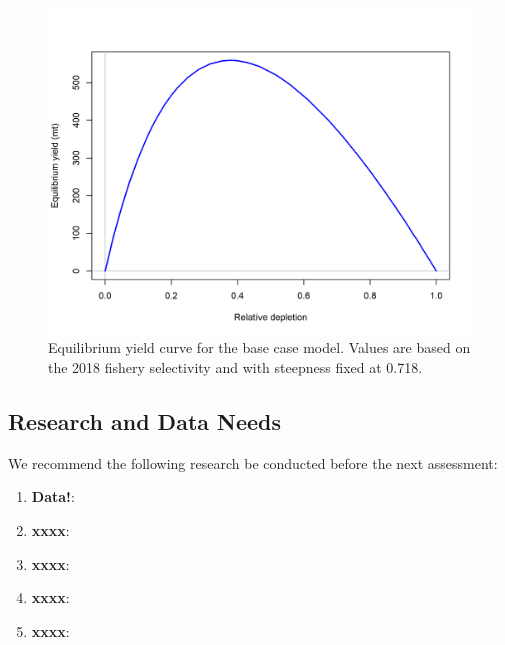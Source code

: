 \documentclass[12pt,]{article}
\begin{document}
\begin{figure}
\centering
\includegraphics{r4ss/plots_mod1/yield1_yield_curve.png}
\caption{Equilibrium yield curve for the base case model. Values are
based on the 2018 fishery selectivity and with steepness fixed at 0.718.
\label{fig:Yield_all}}
\end{figure}

\FloatBarrier

\newpage

\hypertarget{research-and-data-needs}{%
\subsection*{Research and Data Needs}\label{research-and-data-needs}}

We recommend the following research be conducted before the next
assessment:

\begin{enumerate}

\item \textbf{Data!}: 

\item \textbf{xxxx}:

\item \textbf{xxxx}:

\item \textbf{xxxx}:

\item \textbf{xxxx}:

\end{enumerate}
\end{document}
